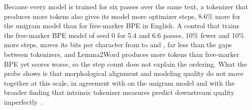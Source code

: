 Because every model is trained for six passes over the same text, a tokenizer that produces more tokens also gives its model more optimizer steps, 8.6\% more for the unigram model than for free-marker BPE in English.
A control that trains the free-marker BPE model of seed 0 for 5.4 and 6.6 passes, 10\% fewer and 10\% more steps, moves its bits per character from \nBpcControlBase{} to \nBpcControlLow{} and \nBpcControlHigh{}, far less than the gaps between tokenizers, and Lemma2Word produces more tokens than free-marker BPE yet scores worse, so the step count does not explain the ordering.
What the probe shows is that morphological alignment and modeling quality do not move together at this scale, in agreement with \citet{bostrom2020bpe} on the unigram model and with the broader finding that intrinsic tokenizer measures predict downstream quality imperfectly~\cite{schmidt2024tokenization,ali2024tokenizer}.
